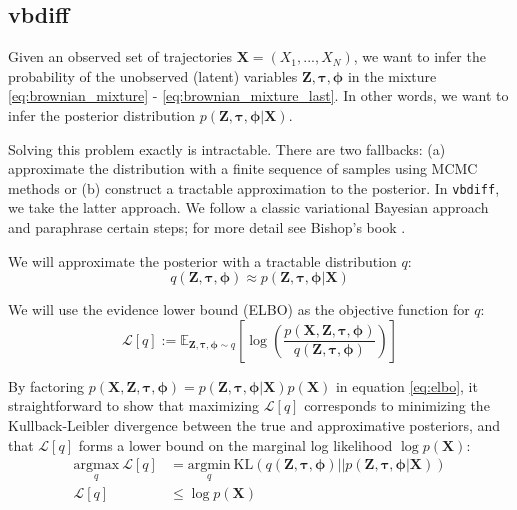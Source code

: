 \documentclass{article}
\let\vec\boldsymbol
\begin{document}
\subsection{vbdiff}

Given an observed set of trajectories $\vec{X} = (X_{1}, ..., X_{N})$, we
want to infer the probability of the unobserved (latent) variables
$\vec{Z}, \boldsymbol{\tau}, \boldsymbol{\phi}$ in the mixture \ref{eq:brownian_mixture} - \ref{eq:brownian_mixture_last}.
In other words, we want to infer the posterior distribution
$p \left( \vec{Z}, \boldsymbol{\tau}, \boldsymbol{\phi} | \vec{X} \right)$. \newline

Solving this problem exactly is intractable. There are two fallbacks:
(a) approximate the distribution with a finite sequence of samples using
MCMC methods or (b) construct a tractable approximation to the posterior.
In \verb|vbdiff|, we take the latter approach. We follow
a classic variational Bayesian approach and paraphrase certain steps;
for more detail see Bishop's book \cite{bishop2006}. \newline

We will approximate the posterior with a tractable distribution $q$:
\[
    q \left( \vec{Z}, \boldsymbol{\tau}, \boldsymbol{\phi} \right) \approx p \left( \vec{Z}, \boldsymbol{\tau}, \boldsymbol{\phi} | \vec{X} \right)
\]

We will use the evidence lower bound (ELBO) as the objective function for $q$:
\begin{equation}\label{eq:elbo}
    \mathcal{L} \left[ q \right] := \mathbb{E}_{\vec{Z}, \boldsymbol{\tau}, \boldsymbol{\phi} \sim q} \left[
        \log \left(
            \frac{ p \left( \vec{X}, \vec{Z}, \boldsymbol{\tau}, \boldsymbol{\phi} \right)}{ q \left( \vec{Z}, \boldsymbol{\tau}, \boldsymbol{\phi} \right) }
        \right)
    \right]
\end{equation}

By factoring $p \left( \vec{X}, \vec{Z}, \boldsymbol{\tau}, \boldsymbol{\phi} \right) = p \left( \vec{Z}, \boldsymbol{\tau}, \boldsymbol{\phi} | \vec{X} \right) p \left( \vec{X} \right)$ in equation \ref{eq:elbo}, it straightforward to show that maximizing $\mathcal{L} [q]$ corresponds to minimizing the Kullback-Leibler divergence between the true and approximative posteriors, and that $\mathcal{L}[q]$ forms a lower bound on the marginal log likelihood $\log p (\vec{X})$:
\begin{align*}
    \underset{q}{\text{argmax}} \: \mathcal{L}[q] &= \underset{q}{\text{argmin}} \: \text{KL} \left( q(\vec{Z}, \boldsymbol{\tau}, \boldsymbol{\phi}) || p (\vec{Z}, \boldsymbol{\tau}, \boldsymbol{\phi} | \vec{X} ) \right) \\
    \mathcal{L}[q] &\leq \log p (\vec{X})
\end{align*}
\end{document}
